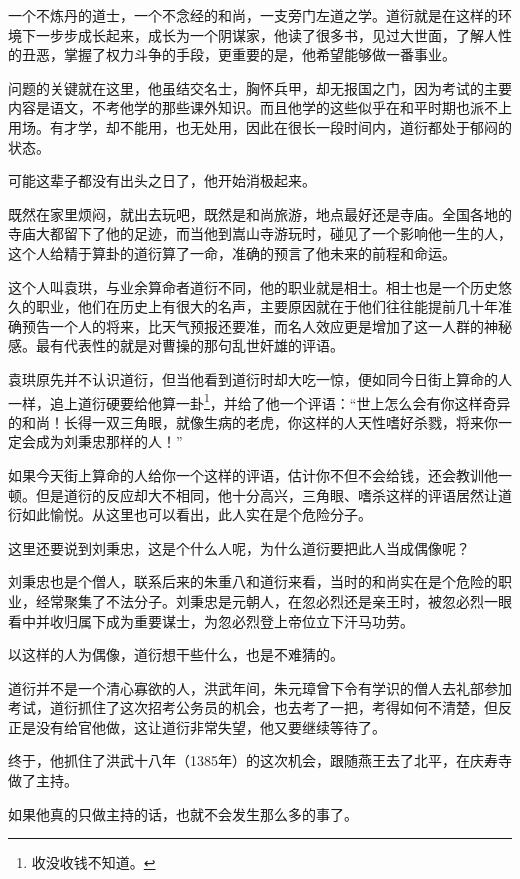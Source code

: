\begin{multicols}{\theparacolNo}
		一个不炼丹的道士，一个不念经的和尚，一支旁门左道之学。道衍就是在这样的环境下一步步成长起来，成长为一个阴谋家，他读了很多书，见过大世面，了解人性的丑恶，掌握了权力斗争的手段，更重要的是，他希望能够做一番事业。

		问题的关键就在这里，他虽结交名士，胸怀兵甲，却无报国之门，因为考试的主要内容是语文，不考他学的那些课外知识。而且他学的这些似乎在和平时期也派不上用场。有才学，却不能用，也无处用，因此在很长一段时间内，道衍都处于郁闷的状态。

		可能这辈子都没有出头之日了，他开始消极起来。

		既然在家里烦闷，就出去玩吧，既然是和尚旅游，地点最好还是寺庙。全国各地的寺庙大都留下了他的足迹，而当他到嵩山寺游玩时，碰见了一个影响他一生的人，这个人给精于算卦的道衍算了一命，准确的预言了他未来的前程和命运。

		这个人叫袁珙，与业余算命者道衍不同，他的职业就是相士。相士也是一个历史悠久的职业，他们在历史上有很大的名声，主要原因就在于他们往往能提前几十年准确预告一个人的将来，比天气预报还要准，而名人效应更是增加了这一人群的神秘感。最有代表性的就是对曹操的那句乱世奸雄的评语。

		袁珙原先并不认识道衍，但当他看到道衍时却大吃一惊，便如同今日街上算命的人一样，追上道衍硬要给他算一卦\footnote{收没收钱不知道。}，并给了他一个评语：“世上怎么会有你这样奇异的和尚！长得一双三角眼，就像生病的老虎，你这样的人天性嗜好杀戮，将来你一定会成为刘秉忠那样的人！”

		如果今天街上算命的人给你一个这样的评语，估计你不但不会给钱，还会教训他一顿。但是道衍的反应却大不相同，他十分高兴，三角眼、嗜杀这样的评语居然让道衍如此愉悦。从这里也可以看出，此人实在是个危险分子。

		这里还要说到刘秉忠，这是个什么人呢，为什么道衍要把此人当成偶像呢？

		刘秉忠也是个僧人，联系后来的朱重八和道衍来看，当时的和尚实在是个危险的职业，经常聚集了不法分子。刘秉忠是元朝人，在忽必烈还是亲王时，被忽必烈一眼看中并收归属下成为重要谋士，为忽必烈登上帝位立下汗马功劳。

		以这样的人为偶像，道衍想干些什么，也是不难猜的。

		道衍并不是一个清心寡欲的人，洪武年间，朱元璋曾下令有学识的僧人去礼部参加考试，道衍抓住了这次招考公务员的机会，也去考了一把，考得如何不清楚，但反正是没有给官他做，这让道衍非常失望，他又要继续等待了。

		终于，他抓住了洪武十八年（1385年）的这次机会，跟随燕王去了北平，在庆寿寺做了主持。

		如果他真的只做主持的话，也就不会发生那么多的事了。


\end{multicols}
